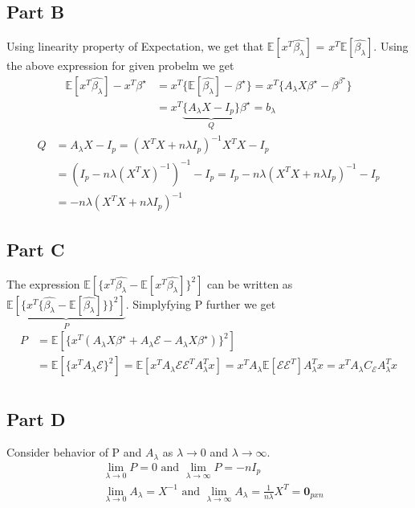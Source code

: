 \documentclass[11pt]{article}
\begin{document}
\subsection{Part B}
Using linearity property of Expectation, we get that $\mathbb{E}[x^T\hat{\beta_{\lambda}}]$ = $x^T\mathbb{E}[\hat{\beta_{\lambda}}]$. Using the above expression for given probelm we get
\begin{equation*}
	\begin{split}
		\mathbb{E}[x^T\hat{\beta_{\lambda}}] - x^T\beta^\star &= x^T\{\mathbb{E}[\hat{\beta_{\lambda}}] - \beta^\star\} = x^T\{A_{\lambda}X\beta^{\star} - \beta^{\beta^{\star}}\} \\
		& = x^T\underbrace{\{A_{\lambda}X - I_p\}}_Q\beta^{\star} = b_\lambda
	\end{split}
\end{equation*}
\begin{equation*}
	\begin{split}
		Q  & = A_{\lambda}X - I_p = (X^TX +n\lambda I_p)^{-1}X^TX - I_p \\
		& = (I_p - n\lambda (X^TX)^{-1})^{-1} - I_p = I_p - n\lambda(X^TX + n\lambda I_p)^{-1} - I_p \\
		& = - n\lambda(X^TX + n\lambda I_p)^{-1}
	\end{split}
\end{equation*}
\subsection{Part C}
The expression $\mathbb{E}[\{x^T\hat{\beta_\lambda} - \mathbb{E}[x^T\hat{\beta_\lambda}]\}^2]$ can be written as  $\underbrace{\mathbb{E}[\{x^T\{\hat{\beta_\lambda} - \mathbb{E}[\hat{\beta_\lambda}]\}\}^2]}_P$. Simplyfying P further we get
\begin{equation*}
	\begin{split}
		P & = \mathbb{E}[\{x^T(A_\lambda X\beta^\star + A_\lambda\mathcal{E} - A_\lambda X\beta^\star)\}^2] \\
		& =  \mathbb{E}[\{x^TA_\lambda\mathcal{E}\}^2] = \mathbb{E}[x^TA_\lambda\mathcal{E}\mathcal{E}^TA_\lambda^Tx] = x^TA_\lambda \mathbb{E}[\mathcal{E}\mathcal{E}^T]A_\lambda^Tx  = x^TA_\lambda C_{\mathcal{E}}A_\lambda^Tx\\
	\end{split}
\end{equation*}
\subsection{Part D}
Consider behavior of P and $A_\lambda$ as $\lambda \rightarrow 0$ and $\lambda \rightarrow \infty$.
\begin{equation*}
	\begin{split}
		& \lim\limits_{\lambda \rightarrow 0} P = 0 \text{ and }  \lim\limits_{\lambda \rightarrow \infty} P = -nI_p \\
		& \lim\limits_{\lambda \rightarrow 0} A_\lambda = X^{-1} \text{ and }  \lim\limits_{\lambda \rightarrow \infty} A_\lambda = \frac{1}{n\lambda}X^T = \boldsymbol{0}_{pxn} \\		
	\end{split}
\end{equation*}
\end{document}
